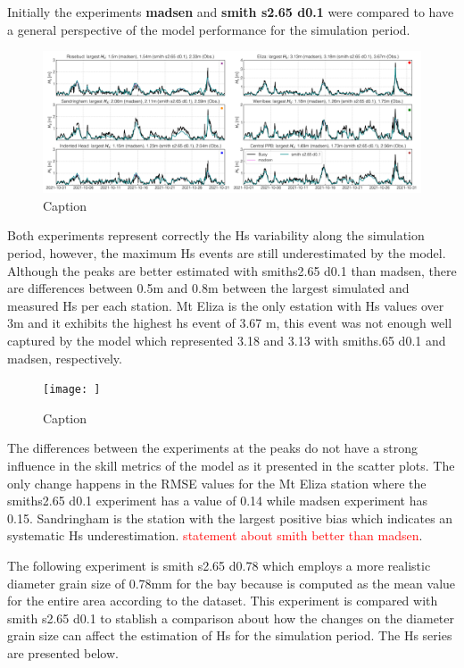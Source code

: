 \documentclass[12pt]{article}
\begin{document}
Initially the experiments \textbf{madsen} and \textbf{smith s2.65 d0.1} were compared to have a general perspective of the model performance for the simulation period. 

\begin{figure}[h]
    \centering
    \includegraphics[scale=0.3]{plots/hs_series/madsen_vs_smith s2.65 d0.1_horz.png}
    \caption{Caption}
    \label{fig:enter-label}
\end{figure}

Both experiments represent correctly the Hs variability along the simulation period, however, the maximum Hs events are still underestimated by the model. Although the peaks are better estimated with smiths2.65 d0.1 than madsen, there are differences between 0.5m and 0.8m between the largest simulated and measured Hs per each station. Mt Eliza is the only estation with Hs values over 3m and it exhibits the highest hs event of 3.67 m, this event was not enough well captured by the model which represented 3.18 and 3.13 with smiths.65 d0.1 and madsen, respectively.

\begin{figure}
    \centering
    \texttt{[image: ]}
    \caption{Caption}
    \label{fig:enter-label}
\end{figure}

The differences between the experiments at the peaks do not have a strong influence in the skill metrics of the model as it presented in the scatter plots. The only change happens in the RMSE values for the Mt Eliza station where the smiths2.65 d0.1 experiment has a value of 0.14 while madsen experiment has 0.15. Sandringham is the station with the largest positive bias which indicates an systematic Hs underestimation. \textcolor{red}{statement about smith better than madsen}.

The following experiment is smith s2.65 d0.78 which employs a more realistic diameter grain size of 0.78mm for the bay because is computed as the mean value for the entire area according to the dataset. This experiment is compared with smith s2.65 d0.1 to stablish a comparison about how the changes on the diameter grain size can affect the estimation of Hs for the simulation period. The Hs series are presented below.
\end{document}
